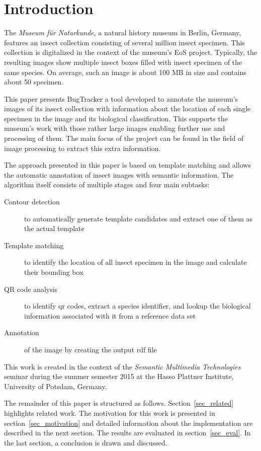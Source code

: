 \section{Introduction}
\label{sec_introduction}

The \emph{Museum für Naturkunde}, a natural history museum in Berlin, Germany, features an insect collection consisting of several million insect specimen.
This collection is digitalized in the context of the museum's EoS project.
Typically, the resulting images show multiple insect boxes  filled with insect specimen of the same species.
On average, such an image is about 100 MB in size and contains about 50 specimen.

This paper presents BugTracker \textendash{} a tool developed to annotate the museum's images of its insect collection with information about the location of each single specimen in the image and its biological classification.
This supports the museum's work with those rather large images  enabling further use and processing of them.
The main focus of the project can be found in the field of image processing to extract this extra information.

The approach presented in this paper is based on template matching and allows the automatic annotation of insect images with semantic information.
The algorithm itself consists of multiple stages and four main subtasks:

\begin{description}
    \item[Contour detection] to automatically generate template candidates and extract one of them as the actual template
    \item[Template matching] to identify the location of all insect specimen in the image and calculate their bounding box
    \item[QR code analysis] to identify qr codes, extract a species identifier, and lookup the biological information associated with it from a reference data set
    \item[Annotation] of the image by creating the output rdf file
\end{description}

This work is created in the context of the \emph{Semantic Multimedia Technologies} seminar during the summer semester 2015 at the Hasso Plattner Institute, University of Potsdam, Germany.

The remainder of this paper is structured as follows. 
Section~\ref{sec_related} highlights related work.
The motivation for this work is presented in section~\ref{sec_motivation} and detailed information about the implementation are described in the next section.
The results are evaluated in section~\ref{sec_eval}.
In the last section, a conclusion is drawn and discussed.
